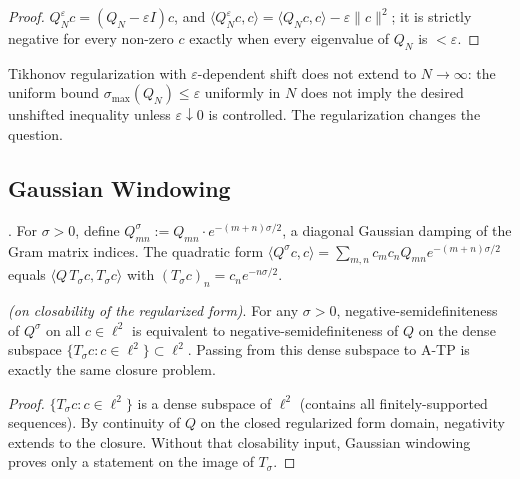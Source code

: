 \begin{proof}
\(Q_{N}^{\varepsilon}c=(Q_{N}-\varepsilon I)c\), and
\(\langle Q_{N}^{\varepsilon}c,c\rangle=\langle Q_{N}c,c\rangle-\varepsilon\|c\|^{2}\);
it is strictly negative for every non-zero \(c\) exactly when every
eigenvalue of \(Q_N\) is \(<\varepsilon\).
\end{proof}

\begin{remark}
\label{v4-arith:w7-h:rem:tikhonov-ceiling}
Tikhonov regularization with \(\varepsilon\)-dependent shift does not
extend to \(N\to\infty\): the uniform bound
\(\sigma_{\max}(Q_{N})\leq\varepsilon\) uniformly in \(N\) does not imply
the desired unshifted inequality unless \(\varepsilon\downarrow0\) is
controlled. The regularization changes the question.
\end{remark}

\subsection{Gaussian Windowing}
\label{v4-arith:w7-h:regularizations:gaussian}

\begin{definition}
\label{v4-arith:w7-h:def:gaussian-window}
\ClaimStatusDefinitional. For \(\sigma>0\), define
\(Q^{\sigma}_{mn}:=Q_{mn}\cdot e^{-(m+n)\sigma/2}\), a diagonal
Gaussian damping of the Gram matrix indices. The quadratic form
\(\langle Q^{\sigma}c,c\rangle=\sum_{m,n}c_{m}c_{n}Q_{mn}e^{-(m+n)\sigma/2}\)
equals \(\langle Q\,T_{\sigma}c,T_{\sigma}c\rangle\) with
\((T_{\sigma}c)_{n}=c_{n}e^{-n\sigma/2}\).
\end{definition}

\begin{lemma}
\label{v4-arith:w7-h:lem:gaussian-no-help}
\ClaimStatusProvedHereConditional \emph{(on closability of the
regularized form)}. For any \(\sigma>0\), negative-semidefiniteness
of \(Q^{\sigma}\) on all \(c\in\ell^{2}\) is equivalent to
negative-semidefiniteness of \(Q\) on the dense subspace
\(\{T_{\sigma}c:c\in\ell^{2}\}\subset\ell^{2}\). Passing from this
dense subspace to A-TP is exactly the same closure problem.
\end{lemma}

\begin{proof}
\(\{T_{\sigma}c:c\in\ell^{2}\}\) is a dense subspace of \(\ell^{2}\)
(contains all finitely-supported sequences). By continuity of \(Q\)
on the closed regularized form domain, negativity extends to the
closure. Without that closability input, Gaussian windowing proves
only a statement on the image of \(T_{\sigma}\).
\end{proof}


